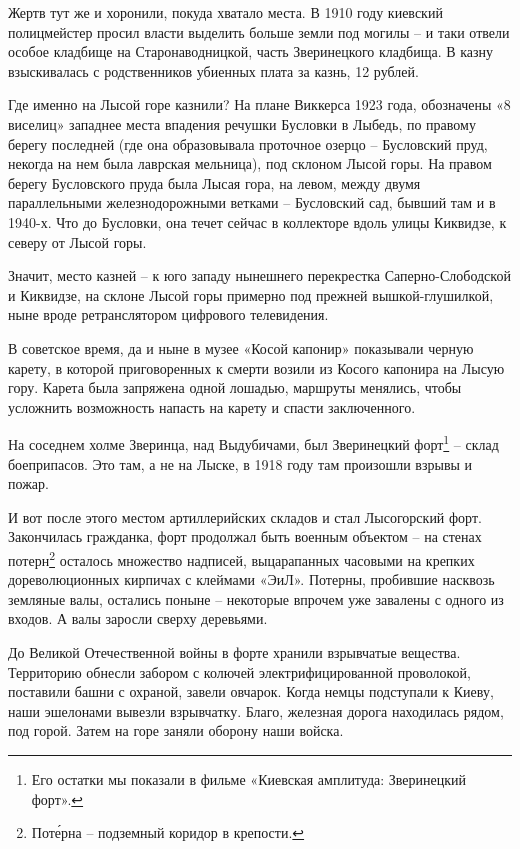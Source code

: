 Жертв тут же и хоронили, покуда хватало места. В 1910 году киевский полицмейстер просил власти выделить больше земли под могилы – и таки отвели особое кладбище на Старонаводницкой, часть Зверинецкого кладбища. В казну взыскивалась с родственников убиенных плата за казнь, 12 рублей.

Где именно на Лысой горе казнили? На плане Виккерса 1923 года, обозначены «8 виселиц» западнее места впадения речушки Бусловки в Лыбедь, по правому берегу последней (где она образовывала проточное озерцо – Бусловский пруд, некогда на нем была лаврская мельница), под склоном Лысой горы. На правом берегу Бусловского пруда была Лысая гора, на левом, между двумя параллельными железнодорожными ветками – Бусловский сад, бывший там и в 1940-х. Что до Бусловки, она течет сейчас в коллекторе вдоль улицы Киквидзе, к северу от Лысой горы.

Значит, место казней – к юго западу нынешнего перекрестка Саперно-Слободской и Киквидзе, на склоне Лысой горы примерно под прежней вышкой-глушилкой, ныне вроде ретранслятором цифрового телевидения.

В советское время, да и ныне в музее «Косой капонир» показывали черную карету, в которой приговоренных к смерти возили из Косого капонира на Лысую гору. Карета была запряжена одной лошадью, маршруты менялись, чтобы усложнить возможность напасть на карету и спасти заключенного.

На соседнем холме Зверинца, над Выдубичами, был Зверинецкий форт\footnote{Его остатки мы показали в фильме «Киевская амплитуда: Зверинецкий форт».} – склад боеприпасов. Это там, а не на Лыске, в 1918 году там произошли взрывы и пожар.

И вот после этого местом артиллерийских складов и стал Лысогорский форт. Закончилась гражданка, форт продолжал быть военным объектом – на стенах потерн\footnote{Пот\'ерна – подземный коридор в крепости.} осталось множество надписей, выцарапанных часовыми на крепких дореволюционных кирпичах с клеймами «ЭиЛ». Потерны, пробившие насквозь земляные валы, остались поныне – некоторые впрочем уже завалены с одного из входов. А валы заросли сверху деревьями.


До Великой Отечественной войны в форте хранили взрывчатые вещества. Территорию обнесли забором с колючей электрифицированной проволокой, поставили башни с охраной, завели овчарок. Когда немцы подступали к Киеву, наши эшелонами вывезли взрывчатку. Благо, железная дорога находилась рядом, под горой. Затем на горе заняли оборону наши войска.

